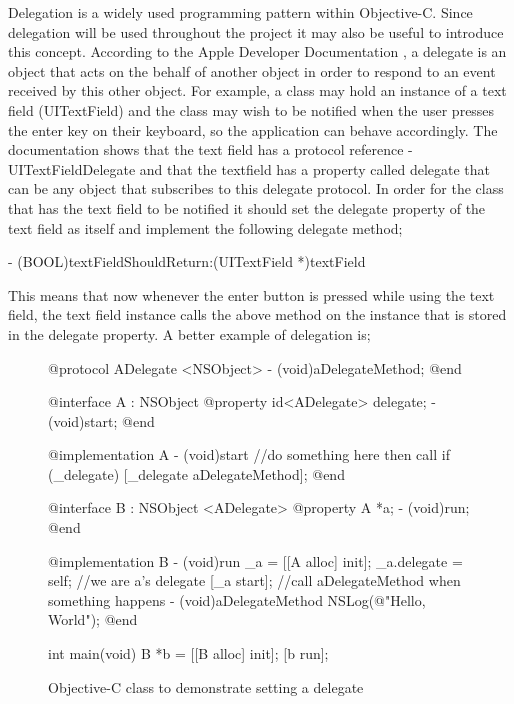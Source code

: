 \documentclass[12pt]{report}
\begin{document}
Delegation is a widely used programming pattern within Objective-C. Since delegation will be used throughout the project it may also be useful to introduce this concept. According to the Apple Developer Documentation \cite{delegates}, a delegate is an object that acts on the behalf of another object in order to respond to an event received by this other object. For example, a class may hold an instance of a text field (UITextField) and the class may wish to be notified when the user presses the enter key on their keyboard, so the application  can behave accordingly. The documentation shows that the text field has a protocol reference - UITextFieldDelegate and that the textfield has a property called delegate that can be any object that subscribes to this delegate protocol. In order for the class that has the text field to be notified it should set the delegate property of the text field as itself and implement the following delegate method;

\begin{objccode}
- (BOOL)textFieldShouldReturn:(UITextField *)textField 
\end{objccode}

This means that now whenever the enter button is pressed while using the text field, the text field instance calls the above method on the instance that is stored in the delegate property. A better example of delegation is;

\begin{figure}[H]
\begin{objccode}
@protocol ADelegate <NSObject>
- (void)aDelegateMethod;
@end

@interface A : NSObject {}
@property id<ADelegate> delegate;
- (void)start;
@end

@implementation A
- (void)start
{
    //do something here then call
    if (_delegate) [_delegate aDelegateMethod];
}
@end

@interface B : NSObject <ADelegate>
@property A *a;
- (void)run;
@end

@implementation B
- (void)run
{
    _a = [[A alloc] init];
    _a.delegate = self; //we are a's delegate
    [_a start]; //call aDelegateMethod when something happens
}
- (void)aDelegateMethod
{
    NSLog(@"Hello, World");
}
@end

int main(void) 
{
    B *b = [[B alloc] init];
    [b run];
}
\end{objccode}
\caption{Objective-C class to demonstrate setting a delegate}
\label{fig:delegation}
\end{figure}
\end{document}
